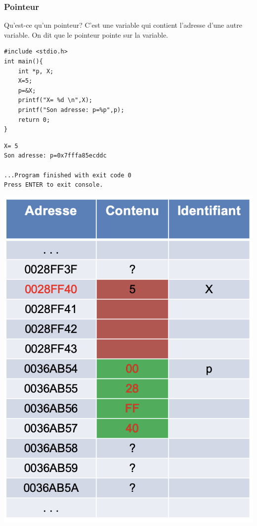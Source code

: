 \documentclass{beamer}
\begin{document}
\begin{frame}[fragile]
\frametitle{Pointeur}
\begin{block}{Qu'est-ce qu'un pointeur?}
C'est une variable qui contient l'adresse d'une autre variable. On dit que le pointeur pointe sur la variable.
\end{block}
\begin{multicols}{2}
\begin{verbatim}  
#include <stdio.h>
int main(){ 
    int *p, X;
    X=5;
    p=&X;
    printf("X= %d \n",X);
    printf("Son adresse: p=%p",p);
    return 0; 
}
\end{verbatim}
{\tiny
\begin{verbatim}
X= 5 
Son adresse: p=0x7fffa85ecddc

...Program finished with exit code 0
Press ENTER to exit console.
\end{verbatim}
}
\includegraphics[scale=0.4]{pointeur1.png} 
\end{multicols}
\end{frame}
  
\end{document}

